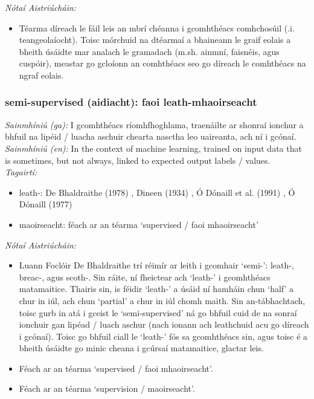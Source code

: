  \noindent \textit{Nótaí Aistriúcháin:}
\begin{itemize}
	\item Téarma díreach le fáil leis an mbrí chéanna i gcomhthéacs comhchosúil (.i. teangeolaíocht). Toisc mórchuid na dtéarmaí a bhaineann le graif eolais a bheith úsáidte mar analach le gramadach (m.sh. ainmní, faisnéis, agus cuspóir), meastar go gcloíonn an comhthéacs seo go díreach le comhthéacs na ngraf eolais.
\end{itemize}


\subsubsection*{semi-supervised (aidiacht): faoi leath-mhaoirseacht}
 \noindent \textit{Sainmhíniú (ga):} I gcomhthéacs ríomhfhoghlama, traenáilte ar shonraí ionchur a bhfuil na lipéid / luacha aschuir chearta nasctha leo uaireanta, ach ní i gcónaí.
\\
 \noindent \textit{Sainmhíniú (en):} In the context of machine learning, trained on input data that is sometimes, but not always, linked to expected output labels / values.
\\
 \noindent \textit{Tagairtí:}
\begin{itemize}
	\item leath-: De Bhaldraithe (1978) \cite{de-bhaldraithe}, Dineen (1934) \cite{dineen}, Ó Dónaill et al. (1991) \cite{focloir-beag}, Ó Dónaill (1977) \cite{odonaill}
	\item maoirseacht: féach ar an téarma `supervised / faoi mhaoirseacht'
\end{itemize}

 \noindent \textit{Nótaí Aistriúcháin:}
\begin{itemize}
	\item Luann Foclóir De Bhaldraithe trí réimír ar leith i gcomhair `semi-': leath-, breac-, agus scoth-. Sin ráite, ní fheictear ach `leath-' i gcomhthéacs matamaitice. Thairis sin, is féidir `leath-' a úsáid ní hamháin chun `half' a chur in iúl, ach chun `partial' a chur in iúl chomh maith. Sin an-tábhachtach, toisc gurb in atá i gceist le `semi-supervised' ná go bhfuil cuid de na sonraí ionchuir gan lipéad / luach aschur (nach ionann ach leathchuid acu go díreach i gcónaí). Toisc go bhfuil ciall le `leath-' fós sa gcomhthéacs sin, agus toisc é a bheith úsáidte go minic cheana i gcúrsaí matamaitice, glactar leis.
	\item Féach ar an téarma `supervised / faoi mhaoirseacht'.
	\item Féach ar an téarma `supervision / maoirseacht'.
\end{itemize}


